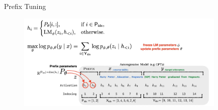 \documentclass[serif, aspectratio=169]{beamer}
\begin{document}
\begin{frame}{Prefix Tuning}
    \begin{figure}
        \centering
        \includegraphics[width=0.9\textwidth]{pic/Prefix tuning.png}
    \end{figure}
\end{frame}
\end{document}
